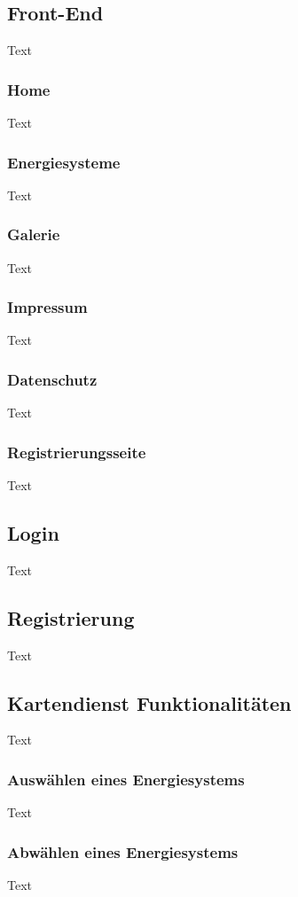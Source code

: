 \subsection{Front-End}
Text

\subsubsection{Home}
Text

\subsubsection{Energiesysteme}
Text

\subsubsection{Galerie}
Text

\subsubsection{Impressum}
Text

\subsubsection{Datenschutz}
Text

\subsubsection{Registrierungsseite}
Text

\subsection{Login}
Text

\subsection{Registrierung}
Text

\subsection{Kartendienst Funktionalitäten}
Text

\subsubsection{Auswählen eines Energiesystems}
Text
\subsubsection{Abwählen eines Energiesystems}
Text

